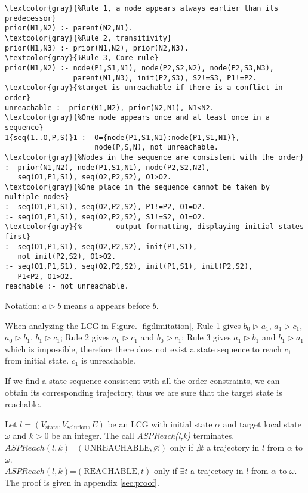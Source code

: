\documentclass{entcs}
\begin{document}
\begin{Verbatim}[commandchars=\\\{\}]
\textcolor{gray}{%Rule 1, a node appears always earlier than its predecessor}
prior(N1,N2) :- parent(N2,N1).
\textcolor{gray}{%Rule 2, transitivity}
prior(N1,N3) :- prior(N1,N2), prior(N2,N3).
\textcolor{gray}{%Rule 3, Core rule}
prior(N1,N2) :- node(P1,S1,N1), node(P2,S2,N2), node(P2,S3,N3), 
                parent(N1,N3), init(P2,S3), S2!=S3, P1!=P2. 
\textcolor{gray}{%target is unreachable if there is a conflict in order}
unreachable :- prior(N1,N2), prior(N2,N1), N1<N2.
\textcolor{gray}{%One node appears once and at least once in a sequence}
1{seq(1..O,P,S)}1 :- O={node(P1,S1,N1):node(P1,S1,N1)},
                     node(P,S,N), not unreachable.
\textcolor{gray}{%Nodes in the sequence are consistent with the order}
:- prior(N1,N2), node(P1,S1,N1), node(P2,S2,N2),
   seq(O1,P1,S1), seq(O2,P2,S2), O1>O2.
\textcolor{gray}{%One place in the sequence cannot be taken by multiple nodes}
:- seq(O1,P1,S1), seq(O2,P2,S2), P1!=P2, O1=O2.
:- seq(O1,P1,S1), seq(O2,P2,S2), S1!=S2, O1=O2.
\textcolor{gray}{%--------output formatting, displaying initial states first}
:- seq(O1,P1,S1), seq(O2,P2,S2), init(P1,S1),
   not init(P2,S2), O1>O2.
:- seq(O1,P1,S1), seq(O2,P2,S2), init(P1,S1), init(P2,S2),
   P1<P2, O1>O2.
reachable :- not unreachable.
\end{Verbatim}

Notation: $a\rhd b$ means $a$ appears before $b$.

When analyzing the LCG in Figure. \ref{fig:limitation},
Rule 1 gives $b_0\rhd a_1$, $a_1\rhd c_1$, $a_0\rhd b_1$, $b_1\rhd c_1$; Rule 2 gives $a_0\rhd c_1$ and $b_0\rhd c_1$; Rule 3 gives $a_1\rhd b_1$ and $b_1\rhd a_1$ which is impossible, therefore there does not exist a state sequence to reach $c_1$ from initial state.
$c_1$ is unreachable.

If we find a state sequence consistent with all the order constraints, we can obtain its corresponding trajectory, thus we are sure that the target state is reachable.

\begin{theorem}

    Let $l=(V_{\mathrm{state}}, V_{\mathrm{solution}}, E)$ be an LCG with initial state $\alpha$ and target local state $\omega$ and $k > 0$ be an integer.
    The call \textit{ASPReach(l,k)} terminates.\\
    $ASPReach(l,k)$=$(\mathrm{UNREACHABLE},\varnothing)$ only if $\nexists t$ a trajectory in $l$ from $\alpha$ to $\omega$.\\
    $ASPReach(l,k)$=$(\mathrm{REACHABLE},t)$ only if $\exists t$ a trajectory in $l$ from $\alpha$ to $\omega$.
    The proof is given in appendix \ref{sec:proof}.
\end{theorem}
\end{document}
